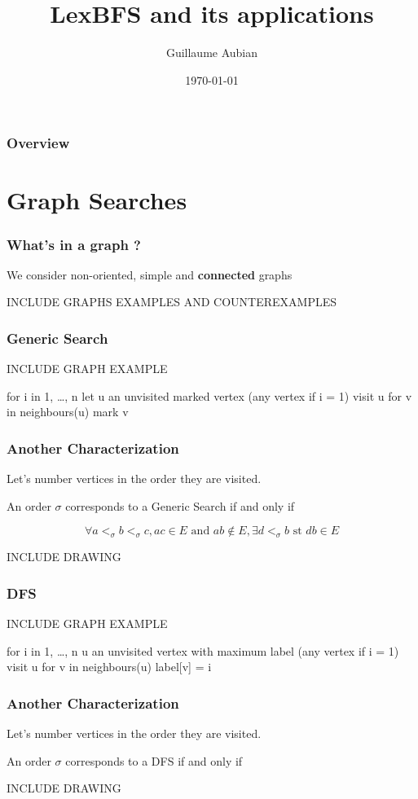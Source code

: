 \documentclass{beamer}
\begin{document}
\title{LexBFS and its applications}  
\author{Guillaume Aubian}
\date{\today} 


\begin{frame}
\titlepage
\end{frame}

\begin{frame}\frametitle{Overview}\tableofcontents
\end{frame} 


\section{Graph Searches} 
\begin{frame}\frametitle{What's in a graph ?}
    \begin{block}
	We consider non-oriented, simple and \textbf{connected} graphs
    \end{block}
    INCLUDE GRAPHS EXAMPLES AND COUNTEREXAMPLES
\end{frame}

\begin{frame}\frametitle{Generic Search}
    INCLUDE GRAPH EXAMPLE
    \begin{definition}
    for i in {1, …, n}
	let u an unvisited marked vertex (any vertex if i = 1)
	visit u
	for v in neighbours(u)
	    mark v
    \end{definition}
\end{frame}

\begin{frame}\frametitle{Another Characterization}
    Let's number vertices in the order they are visited.
    \begin{theorem}
        An order $\sigma$ corresponds to a Generic Search if and only if
	    
	    $$\forall a <_{\sigma} b <_{\sigma} c, ac \in E\text{ and }ab \notin E, \exists d <_{\sigma} b\text{ st }db \in E$$
    \end{theorem}
    INCLUDE DRAWING
\end{frame}

\begin{frame}\frametitle{DFS}
    INCLUDE GRAPH EXAMPLE
    \begin{definition}
    for i in {1, …, n}
	u an unvisited vertex with maximum label (any vertex if i = 1)
	visit u
	for v in neighbours(u)
	   label[v] = i
    \end{definition}
\end{frame}

\begin{frame}\frametitle{Another Characterization}
    Let's number vertices in the order they are visited.
    \begin{theorem}
       An order $\sigma$ corresponds to a DFS if and only if
    \end{theorem}
    INCLUDE DRAWING
\end{frame}
\end{document}
